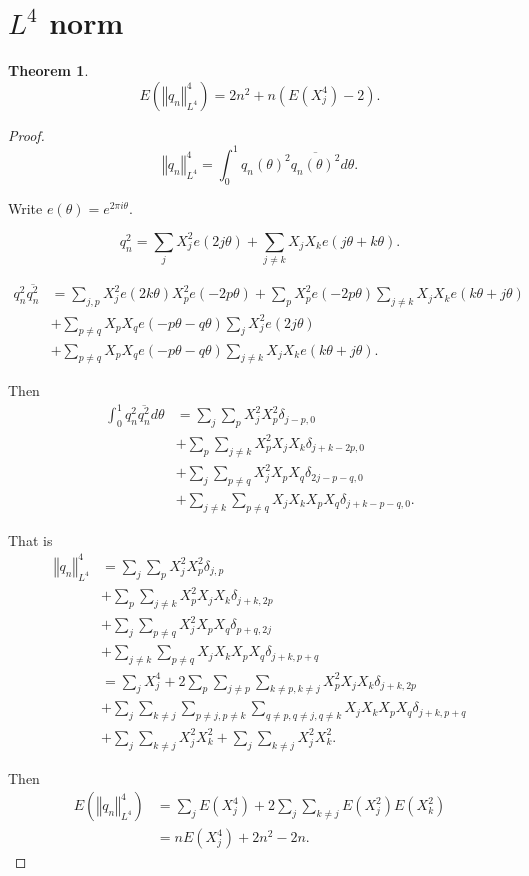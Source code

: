 \documentclass{amsart}
\newcommand{\norm}[1]{\left\Vert #1 \right\Vert}
\newtheorem{theorem}{Theorem}
\begin{document}
\section{$L^4$ norm}
\begin{theorem}
\[
E(\norm{q_n}_{L^4}^4) = 2n^2+ n(E(X_j^4)-2).
\]
\end{theorem}
\begin{proof}
\[
\norm{q_n}_{L^4}^4 = \int_0^{1} q_n(\theta)^2 \overline{q_n(\theta)^2} d\theta.
\]

Write $e(\theta)=e^{2\pi i\theta}$. 

\[
q_n^2 = \sum_j X_j^2 e(2j \theta) + \sum_{j \neq k} X_j X_k e(j\theta+k\theta).
\]

\begin{align*}
q_n^2 \overline{q_n^2}&=\sum_{j,p} X_j^2 e(2k\theta) X_p^2 e(-2p\theta)+\sum_p X_p^2 e(-2p\theta)
\sum_{j \neq k} X_j X_k e(k\theta+j\theta)\\
&+\sum_{p \neq q} X_p X_q e(-p\theta - q\theta) \sum_j X_j^2 e(2j\theta)\\
&+\sum_{p \neq q} X_p X_q e(-p\theta - q\theta) \sum_{j \neq k} X_j X_k e(k\theta+j\theta).
\end{align*}

Then
\begin{align*}
\int_0^1 q_n^2 \overline{q_n^2} d\theta&= \sum_j \sum_p X_j^2 X_p^2 \delta_{j-p,0}\\
&+\sum_p \sum_{j \neq k} X_p^2 X_j X_k \delta_{j+k-2p,0}\\
&+ \sum_j \sum_{p \neq q} X_j^2 X_p X_q \delta_{2j-p-q,0}\\
&+\sum_{j \neq k} \sum_{p \neq q} X_j X_k X_p X_q \delta_{j+k-p-q,0}.
\end{align*}

That is
\begin{align*}
\norm{q_n}_{L^4}^4&=\sum_j \sum_p X_j^2 X_p^2 \delta_{j,p}\\
&+\sum_p \sum_{j \neq k} X_p^2 X_j X_k \delta_{j+k,2p}\\
&+\sum_j \sum_{p \neq q} X_j^2 X_p X_q \delta_{p+q,2j}\\
&+\sum_{j \neq k} \sum_{p \neq q} X_j X_k X_p X_q \delta_{j+k,p+q}\\
&=\sum_j X_j^4 + 2 \sum_p \sum_{j \neq p} \sum_{k \neq p, k \neq j} X_p^2 X_j X_k \delta_{j+k,2p}\\
&+\sum_j \sum_{k \neq j} \sum_{p \neq j, p \neq k} \sum_{q \neq p, q \neq j, q \neq k} X_j X_k X_p X_q \delta_{j+k,p+q}\\
&+\sum_j \sum_{k \neq j} X_j^2 X_k^2 + \sum_j \sum_{k \neq j} X_j^2 X_k^2.
\end{align*}


Then
\begin{align*}
E(\norm{q_n}_{L^4}^4) &= \sum_j E(X_j^4) + 2\sum_j \sum_{k \neq j} E(X_j^2) E(X_k^2)\\
&=nE(X_j^4) + 2n^2 -2n.
\end{align*}
\end{proof}
\end{document}
